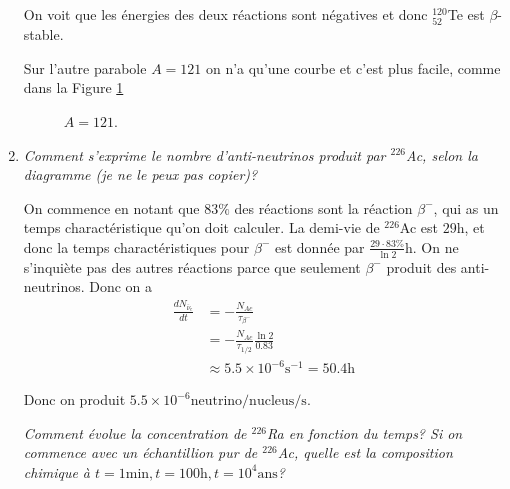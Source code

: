 \documentclass[10pt]{report}
\newcommand{\scinot}[2]{#1\times 10^{#2}}
\newcommand{\rd}[2]{\frac{d#1}{d#2}}
\begin{document}
\begin{enumerate}[1.]
        On voit que les \'energies des deux r\'eactions sont n\'egatives et donc $_{52}^{120}$Te est $\beta$-stable.
        
        Sur l'autre parabole $A = 121$ on n'a qu'une courbe et c'est plus facile, comme dans la Figure \ref{06.10.121}
        \begin{figure}[!h]
            \centering
            \caption{$A = 121$.}
            \label{06.10.121}
        \end{figure}

    \item \emph{Comment s'exprime le nombre d'anti-neutrinos produit par $^{226}$Ac, selon la diagramme (je ne le peux pas copier)?}

        On commence en notant que $83\%$ des r\'eactions sont la r\'eaction $\beta^-$, qui as un temps charact\'eristique qu'on doit calculer. La demi-vie de $^{226}$Ac est $29$h, et donc la temps charact\'eristiques pour $\beta^-$ est donn\'ee par $\frac{29 \cdot 83\%}{\ln 2}$h. On ne s'inqui\`ete pas des autres r\'eactions parce que seulement $\beta^-$ produit des anti-neutrinos. Donc on a
        \begin{align}
            \rd{N_{\bar{\nu}_e}}{t} &= -\frac{N_{Ac}}{\tau_{\beta^-}}\\
            &= -\frac{N_{Ac}}{\tau_{1/2}}\frac{\ln 2}{0.83}\\
            &\approx \scinot{5.5}{-6}\mathrm{s^{-1}} = 50.4\mathrm{h}
        \end{align}

        Donc on produit $\scinot{5.5}{-6}\mathrm{neutrino/nucleus/s}$. 

        \emph{Comment \'evolue la concentration de $^{226}$Ra en fonction du temps? Si on commence avec un \'echantillion pur de $^{226}$Ac, quelle est la composition chimique \`a $t = 1\mathrm{min}, t = 100 \mathrm{h}, t = 10^4\mathrm{ans}$?}


\end{enumerate}
\end{document}
